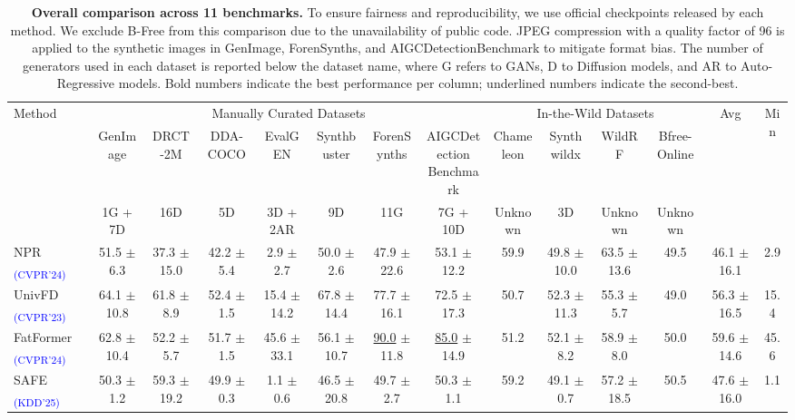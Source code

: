 \documentclass{article}
\begin{document}
\begin{table}[t!]
\centering
\caption{\textbf{Overall comparison across 11 benchmarks.} To ensure fairness and reproducibility, we use official checkpoints released by each method. We exclude B-Free \cite{guillaro2024bias} from this comparison due to the unavailability of public code. JPEG compression with a quality factor of 96 is applied to the synthetic images in GenImage, ForenSynths, and AIGCDetectionBenchmark to mitigate format bias. The number of generators used in each dataset is reported below the dataset name, where G refers to GANs, D to Diffusion models, and AR to Auto-Regressive models. Bold numbers indicate the best performance per column; underlined numbers indicate the second-best.}
\label{tab:compare-methods}
\begin{adjustbox}{width=1.0\linewidth}
\begin{tabular}{lccccccccccccc}
\toprule
\multirow{3}{*}{Method} & \multicolumn{7}{c}{Manually Curated Datasets} & \multicolumn{4}{c}{In-the-Wild Datasets} & \multirow{3}{*}{Avg} & \multirow{3}{*}{Min} \\
\cmidrule(lr){2-8} \cmidrule(l){9-12}
 & GenImage & DRCT-2M & DDA-COCO & EvalGEN & Synthbuster & ForenSynths & \makecell{AIGCDetection \\Benchmark} & Chameleon & Synthwildx & WildRF & Bfree-Online \\
 & 1G + 7D & 16D & 5D & 3D + 2AR & 9D & 11G & 7G + 10D & Unknown & 3D & Unknown & Unknown \\
\cmidrule(lr){1-8} \cmidrule(l){9-12} \cmidrule(l){13-14}
NPR \textsubscript{\textcolor{blue}{(CVPR'24)}} \cite{cozzolino2024zero} & 51.5 $\pm$ 6.3 & 37.3 $\pm$ 15.0 & 42.2 $\pm$ 5.4 & 2.9 $\pm$ 2.7 & 50.0 $\pm$ 2.6 & 47.9 $\pm$ 22.6 & 53.1 $\pm$ 12.2 & 59.9 & 49.8 $\pm$ 10.0 & 63.5 $\pm$ 13.6 & 49.5 & 46.1 $\pm$ 16.1 & 2.9 \\
UnivFD \textsubscript{\textcolor{blue}{(CVPR'23)}} \cite{ojha2023towards} & 64.1 $\pm$ 10.8 & 61.8 $\pm$ 8.9 & 52.4 $\pm$ 1.5 & 15.4 $\pm$ 14.2 & 67.8 $\pm$ 14.4 & 77.7 $\pm$ 16.1 & 72.5 $\pm$ 17.3 & 50.7 & 52.3 $\pm$ 11.3 & 55.3 $\pm$ 5.7 & 49.0 & 56.3 $\pm$ 16.5 & 15.4 \\
FatFormer \textsubscript{\textcolor{blue}{(CVPR'24)}} \cite{liu2024forgery} & 62.8 $\pm$ 10.4 & 52.2 $\pm$ 5.7 & 51.7 $\pm$ 1.5 & 45.6 $\pm$ 33.1 & 56.1 $\pm$ 10.7 & \underline{90.0} $\pm$ 11.8 & \underline{85.0} $\pm$ 14.9 & 51.2 & 52.1 $\pm$ 8.2 & 58.9 $\pm$ 8.0 & 50.0 & 59.6 $\pm$ 14.6 & 45.6 \\
SAFE \textsubscript{\textcolor{blue}{(KDD'25)}} \cite{li2024improving} & 50.3 $\pm$ 1.2 & 59.3 $\pm$ 19.2 & 49.9 $\pm$ 0.3 & 1.1 $\pm$ 0.6 & 46.5 $\pm$ 20.8 & 49.7 $\pm$ 2.7 & 50.3 $\pm$ 1.1 & 59.2 & 49.1 $\pm$ 0.7 & 57.2 $\pm$ 18.5 & 50.5 & 47.6 $\pm$ 16.0 & 1.1 \\

\end{tabular}
\end{adjustbox}
\end{table}
\end{document}
